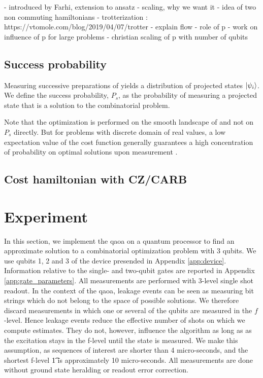 - introduced by Farhi, extension to ansatz
- scaling, why we want it
- idea of two non commuting hamiltonians
- trotterization : https://vtomole.com/blog/2019/04/07/trotter 
- explain flow
- role of p
- work on influence of p for large problems
- christian scaling of p with number of qubits

\subsection{Success probability}
Measuring successive preparations of \optimalstate yields a distribution of projected states $\ket{\psi_i}$.
We define the success probability, $P_s$, as the probability of measuring a projected state that is a solution to the combinatorial problem. 

Note that the optimization is performed on the smooth landscape of \cost{} and not on $P_s$ directly. But for problems with discrete domain of real values, a low expectation value of the cost function generally guarantees a high concentration of probability on optimal solutions upon measurement \cite{Cook2019TheCover, Wang2019XY-mixers:QAOA}.

\subsection{Cost hamiltonian with CZ/CARB}



\section{Experiment}
In this section, we implement the \gls{qaoa} on a quantum processor to find an approximate solution to a combinatorial optimization problem with 3 qubits. We use qubits 1, 2 and 3 of the device presended in Appendix \ref{app:device}. Information relative to the single- and two-qubit gates are reported in Appendix \ref{app:gate_parameters}. All measurements are performed with 3-level single shot readout. In the context of the \gls{qaoa}, leakage events can be seen as measuring bit strings which do not belong to the space of possible solutions. We therefore discard measurements in which one or several of the qubits are measured in the $f$-level. Hence leakage events reduce the effective number of shots on which we compute estimates. They do not, however, influence the algorithm as long as as the excitation stays in the f-level until the state is measured. We make this assumption, as sequences of interest are shorter than 4 micro-seconds, and the shortest f-level \t1 is approximately 10 micro-seconds. All measurements are done without ground state heralding or readout error correction.

